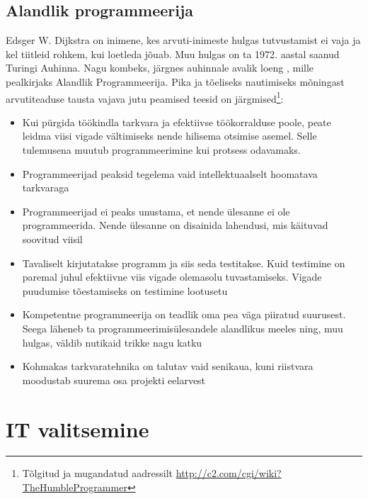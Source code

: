 \documentclass{article}
\begin{document}
\subsection{Alandlik programmeerija}
\label{humble}
Edsger W. Dijkstra on inimene, kes arvuti-inimeste hulgas tutvustamist ei vaja ja kel tiitleid rohkem, kui loetleda jõuab. Muu hulgas on ta 1972. aastal saanud Turingi Auhinna. Nagu kombeks, järgnes auhinnale avalik loeng \citep{yourdon1979classics}, mille pealkirjaks Alandlik Programmeerija. Pika ja tõeliseks nautimiseks mõningast arvutiteaduse tausta vajava jutu peamised teesid on järgmised\footnote{Tõlgitud ja mugandatud aadressilt \url{http://c2.com/cgi/wiki?TheHumbleProgrammer}}:
\begin{itemize}
	\item Kui pürgida töökindla tarkvara ja efektiivse töökorralduse poole, peate leidma viisi vigade vältimiseks nende hilisema otsimise asemel. Selle tulemusena muutub programmeerimine kui protsess odavamaks.
	\item Programmeerijad peaksid tegelema vaid intellektuaalselt hoomatava tarkvaraga
	\item Programmeerijad ei peaks unustama, et nende ülesanne ei ole programmeerida. Nende ülesanne on disainida lahendusi, mis käituvad soovitud viisil
	\item Tavaliselt kirjutatakse programm ja siis seda testitakse. Kuid testimine on paremal juhul efektiivne viis vigade olemasolu tuvastamiseks. Vigade puudumise  tõestamiseks on testimine lootusetu
	\item Kompetentne programmeerija on teadlik oma pea väga piiratud suurusest. Seega läheneb ta programmeerimisülesandele alandlikus meeles ning, muu hulgas, väldib nutikaid trikke nagu katku
	\item Kohmakas tarkvaratehnika on talutav vaid senikaua, kuni riistvara moodustab suurema osa projekti eelarvest
\end{itemize}

\section{IT valitsemine}
\end{document}
